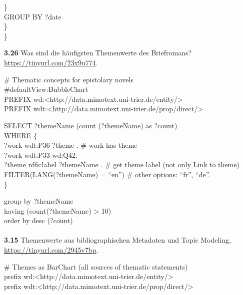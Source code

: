 \documentclass[
  12pt,
  letterpaper,
  DIV=11,
  numbers=noendperiod]{scrreprt}
\makeatletter
\let\oldparagraph\paragraph
\renewcommand{\paragraph}{
    \@ifstar
      \xxxParagraphStar
      \xxxParagraphNoStar
  }
\newcommand{\xxxParagraphStar}[1]{\oldparagraph*{#1}\mbox{}}
\newcommand{\xxxParagraphNoStar}[1]{\oldparagraph{#1}\mbox{}}
\makeatother
\begin{document}
\}\\
GROUP BY ?date\\
\}\\
\}

\textbf{3.26} Was sind die häufigsten Themenwerte des Briefromans?
\url{https://tinyurl.com/23x9u774}.

\# Thematic concepts for epistolary novels\\
\#defaultView:BubbleChart\\
PREFIX
wd:\textless http://data.mimotext.uni-trier.de/entity/\textgreater{}\\
PREFIX
wdt:\textless http://data.mimotext.uni-trier.de/prop/direct/\textgreater{}

SELECT ?themeName (count (?themeName) as ?count)\\
WHERE \{\\
?work wdt:P36 ?theme . \# work has theme\\
?work wdt:P33 wd:Q42.\\
?theme rdfs:label ?themeName . \# get theme label (not only Link to
theme)\\
FILTER(LANG(?themeName) = ``en'') \# other options: ``fr'', ``de''.\\
\}

group by ?themeName\\
having (count(?themeName) \textgreater{} 10)\\
order by desc (?count)

\paragraph{}\label{section-5}

\paragraph{\texorpdfstring{\textbf{3.15} Themenwerte aus
bibliographischen Metadaten und Topic Modeling,
\url{https://tinyurl.com/2945v7bp}.}{3.15 Themenwerte aus bibliographischen Metadaten und Topic Modeling, https://tinyurl.com/2945v7bp.}}\label{themenwerte-aus-bibliographischen-metadaten-und-topic-modeling-httpstinyurl.com2945v7bp.}

\# Themes as BarChart (all sources of thematic statements)\\
prefix
wd:\textless http://data.mimotext.uni-trier.de/entity/\textgreater{}\\
prefix
wdt:\textless http://data.mimotext.uni-trier.de/prop/direct/\textgreater{}
\end{document}
